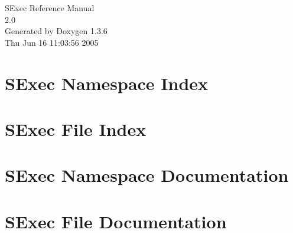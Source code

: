 \documentclass[a4paper]{book}
\begin{document}
\begin{titlepage}
\vspace*{7cm}
\begin{center}
{\Large SExec Reference Manual\\[1ex]\large 2.0 }\\
\vspace*{1cm}
{\large Generated by Doxygen 1.3.6}\\
\vspace*{0.5cm}
{\small Thu Jun 16 11:03:56 2005}\\
\end{center}
\end{titlepage}
\clearemptydoublepage
{}
\tableofcontents
\clearemptydoublepage
{}
\chapter{SExec Namespace Index}

\chapter{SExec File Index}

\chapter{SExec Namespace Documentation}

\chapter{SExec File Documentation}





\printindex
\end{document}
